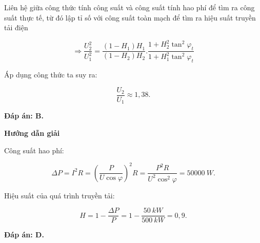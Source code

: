 \begin{dang}{Liên hệ giữa công thức tính công suất và công suất tính hao phí để tìm ra công suất thực tế, từ đó lập tỉ số với công suất toàn mạch để tìm ra hiệu suất truyền tải điện}
{		$$\Rightarrow \dfrac{U_{2}^{2}}{U_{1}^{2}}=\dfrac{(1-{{H}_{1}}){{H}_{1}}}{(1-{{H}_{2}}){{H}_{2}}}.\dfrac{1+H_{2}^{2}{{\tan }^{2}}{{\varphi }_{t}}}{1+H_{1}^{2}{{\tan }^{2}}{{\varphi }_{t}}}$$
		
		Áp dụng công thức ta suy ra:
		
		$$\dfrac{{{U}_{2}}}{{{U}_{1}}}\approx 1,38.$$
		
		\textbf{Đáp án: B.}
	}
	{\begin{center}
			\textbf{Hướng dẫn giải}
		\end{center}
		Công suất hao phí:
		
		$$\Delta P=I^2 R= \left( \dfrac {P}{U\cos \varphi}\right)^2 R= \dfrac {P^2 R}{U^2 \cos^2 \varphi}=\SI{50000}{W}.$$
		
		Hiệu suất của quá trình truyền tải:
		
		$$H=1-\dfrac {\Delta P}{P} = 1-\dfrac {\SI{50}{kW}}{\SI{500}{kW}}= 0,9.$$
		
		\textbf{Đáp án: D.}
	}
	
\end{dang}